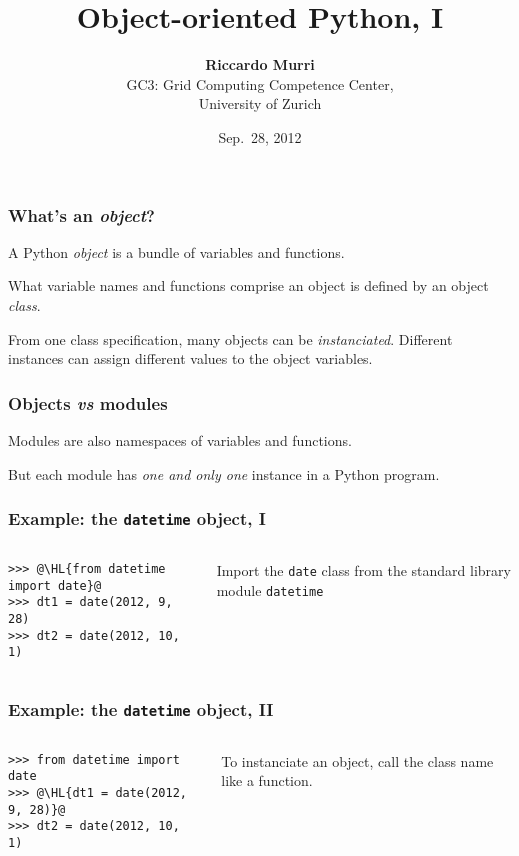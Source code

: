 \documentclass[english,serif,mathserif,xcolor=pdftex,dvipsnames,table]{beamer}
\title[OOP]{%
  Object-oriented Python, I
}
\author[R. Murri]{%
  \textbf{Riccardo Murri} \\
  GC3: Grid Computing Competence Center, \\
  University of Zurich
}
\date{Sep.~28, 2012}
\begin{document}
\maketitle


\begin{frame}
  \frametitle{What's an \emph{object}?}
  A Python \emph{object} is a bundle of variables and functions.

  \+ 
  What variable names and functions comprise an object is defined
  by an object \emph{class}.

  \+ 
  From one class specification, many objects can be
  \emph{instanciated}.  Different instances can assign different
  values to the object variables.
\end{frame}


\begin{frame}
  \frametitle{Objects \emph{vs} modules}

  Modules are also namespaces of variables and functions.

  \+ 
  But each module has \emph{one and only one} instance in a Python
  program.
\end{frame}


\begin{frame}[fragile]
  \frametitle{Example: the \texttt{datetime} object, I}
  \begin{columns}[c]
    \begin{column}{0.5\textwidth}
\begin{lstlisting}
>>> @\HL{from datetime import date}@
>>> dt1 = date(2012, 9, 28)
>>> dt2 = date(2012, 10, 1)
\end{lstlisting}
    \end{column}
    \begin{column}{0.45\textwidth}
      \raggedleft 
      Import the \texttt{date} class from the standard
      library module \texttt{datetime}
    \end{column}
  \end{columns}
\end{frame}


\begin{frame}[fragile]
  \frametitle{Example: the \texttt{datetime} object, II}
  \begin{columns}[c]
    \begin{column}{0.5\textwidth}
\begin{lstlisting}
>>> from datetime import date
>>> @\HL{dt1 = date(2012, 9, 28)}@
>>> dt2 = date(2012, 10, 1)
\end{lstlisting}
    \end{column}
    \begin{column}{0.5\textwidth}
      \raggedleft 
      To instanciate an object, call the class name like a
      function.
    \end{column}
  \end{columns}
\end{frame}
\end{document}
